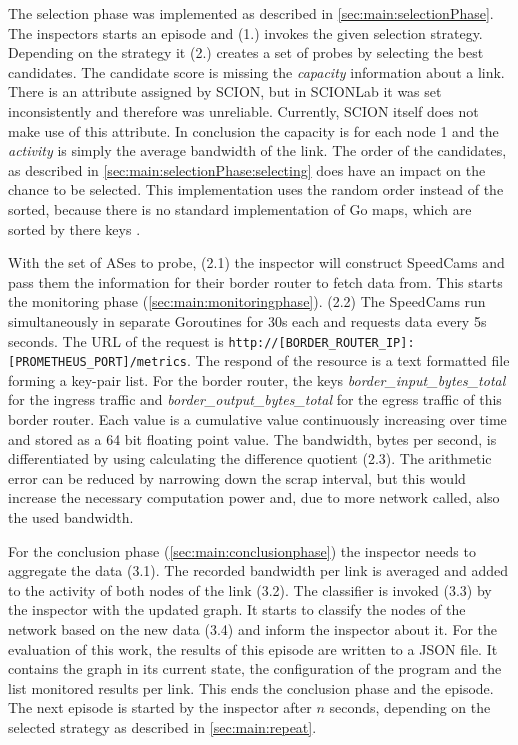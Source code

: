 \documentclass[thesis.tex]{subfiles}
\begin{document}
The selection phase was implemented as described in \autoref{sec:main:selectionPhase}. The inspectors starts an episode and (1.) invokes the given selection strategy. Depending on the strategy it (2.) creates a set of probes by selecting the best candidates. The candidate score is missing the \textit{capacity} information about a link. There is an attribute assigned by SCION, but in SCIONLab it was set inconsistently and therefore was unreliable. Currently, SCION itself does not make use of this attribute. In conclusion the capacity is for each node 1 and the \textit{activity} is simply the average bandwidth of the link.
The order of the candidates, as described in \autoref{sec:main:selectionPhase:selecting} does have an impact on the chance to be selected. This implementation uses the random order instead of the sorted, because there is no standard implementation of Go maps, which are sorted by there keys \cite{goMapsInAction.2013}.

With the set of ASes to probe, (2.1) the inspector will construct SpeedCams and pass them the information for their border router to fetch data from. This starts the monitoring phase (\autoref{sec:main:monitoringphase}). (2.2) The SpeedCams run simultaneously in separate Goroutines for 30s each and requests data every 5s seconds. The URL of the request is \lstinline|http://[BORDER_ROUTER_IP]:[PROMETHEUS_PORT]/metrics|. The respond of the resource is a text formatted file forming a key-pair list. For the border router, the keys \textit{border\_input\_bytes\_total} for the ingress traffic and \textit{border\_output\_bytes\_total} for the egress traffic of this border router. Each value is a cumulative value continuously increasing over time and stored as a 64 bit floating point value. The bandwidth, bytes per second, is differentiated by using calculating the difference quotient (2.3). The arithmetic error can be reduced by narrowing down the scrap interval, but this would increase the necessary computation power and, due to more network called, also the used bandwidth.

For the conclusion phase (\autoref{sec:main:conclusionphase}) the inspector needs to aggregate the data (3.1). The recorded bandwidth per link is averaged and added to the activity of both nodes of the link (3.2). The classifier is invoked (3.3) by the inspector with the updated graph. It starts to classify the nodes of the network based on the new data (3.4) and inform the inspector about it. For the evaluation of this work, the results of this episode are written to a JSON file. It contains the graph in its current state, the configuration of the program and the list monitored results per link. This ends the conclusion phase and the episode. The next episode is started by the inspector after  $n$ seconds, depending on the selected strategy as described in \autoref{sec:main:repeat}.
\end{document}
